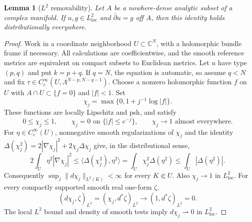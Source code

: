 \documentclass[11pt,reqno]{amsart}
\numberwithin{equation}{section}
\newtheorem{lemma}[theorem]{Lemma}
\theoremstyle{definition}
\theoremstyle{remark}
\begin{document}
\begin{lemma}[$L^2$ removability]\label{lem:l2-removal}
Let $A$ be a nowhere-dense analytic subset of a complex manifold.  If
$u,g\in L^2_{\mathrm{loc}}$ and $\bar\partial u=g$ off $A$, then
this identity holds distributionally everywhere.
\end{lemma}
\begin{proof}
Work in a coordinate neighborhood $U\subset\mathbb C^N$, with a
holomorphic bundle frame if necessary.  All calculations are
coefficientwise, and the smooth reference metrics are equivalent
on compact subsets to Euclidean metrics.  Let $u$ have type $(p,q)$
and put $k=p+q$.  If $q=N$, the equation is automatic, so assume
$q<N$ and fix $\tau\in C_c^\infty(U,\Lambda^{N-p,N-q-1})$.
Choose a nonzero holomorphic function $f$ on $U$ with
$A\cap U\subset\{f=0\}$ and $|f|<1$.  Set
\[
 \chi_j=\max\{0,1+j^{-1}\log|f|\}.
\]
These functions are locally Lipschitz and psh, and satisfy
\[
 0\le\chi_j\le1,\qquad
 \chi_j=0\text{ on }\{|f|\le e^{-j}\},\qquad
 \chi_j\longrightarrow1\text{ almost everywhere}.
\]
For $\eta\in C_c^\infty(U)$, nonnegative smooth regularizations of
$\chi_j$ and the identity
$\Delta(\chi_j^2)=2|\nabla\chi_j|^2+2\chi_j\Delta\chi_j$
give, in the distributional sense,
\[
 2\int_U\eta^2|\nabla\chi_j|^2
 \le\langle\Delta(\chi_j^2),\eta^2\rangle
 =\int_U\chi_j^2\Delta(\eta^2)
 \le\int_U|\Delta(\eta^2)|.
\]
Consequently $\sup_j\|d\chi_j\|_{L^2(K)}<\infty$ for every
$K\Subset U$.  Also $\chi_j\to1$ in $L^2_{\mathrm{loc}}$.  For
every compactly supported smooth real one-form $\zeta$,
\[
 (d\chi_j,\zeta)_{L^2}
   =(\chi_j,d^*\zeta)_{L^2}
   \longrightarrow(1,d^*\zeta)_{L^2}=0.
\]
The local $L^2$ bound and density of smooth tests imply
$d\chi_j\rightharpoonup0$ in $L^2_{\mathrm{loc}}$.


\end{proof}
\end{document}
